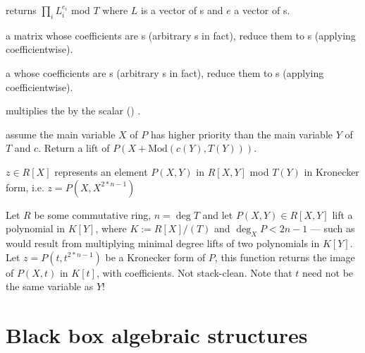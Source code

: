  returns
$\prod_i L_i^{e_i}$ mod $T$ where $L$ is a vector of s and
$e$ a vector of s.


  a matrix whose
coefficients are s (arbitrary s in fact), reduce them to
s (applying  coefficientwise).



  a  whose
coefficients are s (arbitrary s in fact), reduce them to
s (applying  coefficientwise).


 multiplies the 
 by the scalar () .






 assume the main variable
$X$ of $P$ has higher priority than the main variable $Y$ of $T$ and $c$.
Return a lift of $P(X+\text{Mod}(c(Y), T(Y)))$.

 $z\in R[X]$ represents an element
$P(X,Y)$ in $R[X,Y]$ mod $T(Y)$ in Kronecker form, i.e. $z = P(X,X^{2*n-1})$

Let $R$ be some commutative ring, $n = \deg T$ and let $P(X,Y)\in R[X,Y]$ lift
a polynomial in $K[Y]$, where $K := R[X]/(T)$ and $\deg_X P < 2n-1$ --- such as
would result from multiplying minimal degree lifts of two polynomials in
$K[Y]$. Let $z = P(t,t^{2*n-1})$ be a Kronecker form of $P$, this function
returns the image of $P(X,t)$ in $K[t]$, with  coefficients.
Not stack-clean. Note that $t$ need not be the same variable as $Y$!

\chapter{Black box algebraic structures}

